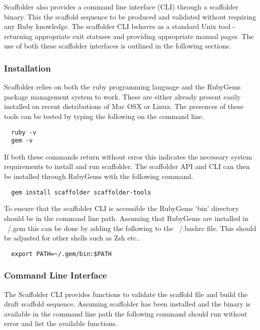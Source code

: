 \documentclass[10pt]{bmc_article}
\newenvironment{bmcformat}{\begin{raggedright}\baselineskip20pt\sloppy\setboolean{publ}{false}}{\end{raggedright}\baselineskip20pt\sloppy}
\begin{document}
\begin{bmcformat}
Scaffolder also provides a command line interface (CLI) through a scaffolder
binary. This the scaffold sequence to be produced and validated without
requiring any Ruby knowledge. The scaffolder CLI behaves as a standard Unix
tool - returning appropriate exit statuses and providing appropriate manual
pages. The use of both these scaffolder interfaces is outlined in the following
sections. \pb

\subsubsection*{Installation} %

Scaffolder relies on both the ruby programming language and the RubyGems
package management system to work. These are either already present easily
installed on recent distributions of Mac OSX or Linux. The presences of these
tools can be tested by typing the following on the command line. \pb

\begin{verbatim}
  ruby -v
  gem -v
\end{verbatim}

If both these commands return without error this indicates the necessary
system requirements to install and run scaffolder. The scaffolder API and CLI
can then be installed through RubyGems with the following command.

\begin{verbatim}
  gem install scaffolder scaffolder-tools
\end{verbatim}

To ensure that the scaffolder CLI is accessible the RubyGems `bin' directory
should be in the command line path. Assuming that RubyGems are installed in
~/.gem this can be done by adding the following to the ~/.bashrc file. This
should be adjusted for other shells such as Zsh etc..

\begin{verbatim}
  export PATH=~/.gem/bin:$PATH
\end{verbatim}

\subsubsection*{Command Line Interface} %

The Scaffolder CLI provides functions to validate the scaffold file and build the draft scaffold sequence. Assuming scaffolder has been installed and the
binary is available in the command line path the following command should run without error and list the available functions. \pb


\end{bmcformat}
\end{document}
